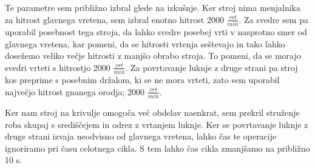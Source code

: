 Te parametre sem približno izbral glede na izkušnje. Ker stroj nima
menjalnika za hitrost glavnega vretena, sem izbral enotno hitrost
2000 \( \frac{vrt}{min} \). Za svedre sem pa uporabil posebnost tega stroja,
da lahko svedre posebej vrti v nasprotno smer od glavnega vretena, kar pomeni,
da se hitrosti vrtenja seštevajo in tako lahko dosežemo veliko večje hitrosti
z manjšo obrabo stroja. To pomeni, da se morajo svedri vrteti s hitrostjo
2000 \( \frac{vrt}{min} \). Za povrtavanje luknje z druge strani pa stroj
kos preprime s posebnim držalom, ki se ne mora vrteti, zato sem uporabil največjo
hitrost gnanega orodja; 2000 \( \frac{vrt}{min} \).

Ker nam stroj na krivulje omogoča več obdelav naenkrat, sem prekril
struženje roba skupaj s središčejem in odrez z vrtanjem luknje.
Ker se povrtavanje luknje z druge strani izvaja neodvisno od
glavnega vretena, lahko čas te operacije ignoriramo pri času
celotnega cikla.
S tem lahko čas cikla zmanjšamo na približno 10 s.
